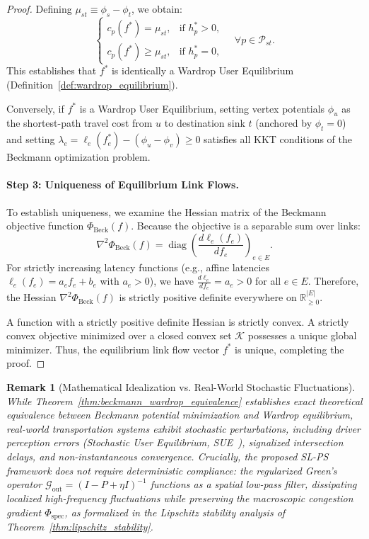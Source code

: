 \documentclass[11pt,a4paper]{article}
\newtheorem{remark}{Remark}
\begin{document}
\begin{proof}
Defining $\mu_{st} \equiv \phi_s - \phi_t$, we obtain:
\begin{equation}
\begin{cases}
c_p(f^*) = \mu_{st}, & \text{if } h_p^* > 0, \\
c_p(f^*) \ge \mu_{st}, & \text{if } h_p^* = 0,
\end{cases}
\quad \forall p \in \mathcal{P}_{st}.
\end{equation}
This establishes that $f^*$ is identically a Wardrop User Equilibrium (Definition~\ref{def:wardrop_equilibrium}).

Conversely, if $f^*$ is a Wardrop User Equilibrium, setting vertex potentials $\phi_u$ as the shortest-path travel cost from $u$ to destination sink $t$ (anchored by $\phi_t = 0$) and setting $\lambda_e = \ell_e(f_e^*) - (\phi_u - \phi_v) \ge 0$ satisfies all KKT conditions of the Beckmann optimization problem.

\paragraph{Step 3: Uniqueness of Equilibrium Link Flows.}
To establish uniqueness, we examine the Hessian matrix of the Beckmann objective function $\Phi_{\text{Beck}}(f)$. Because the objective is a separable sum over links:
\begin{equation}
\nabla^2 \Phi_{\text{Beck}}(f) = \operatorname{diag}\left( \frac{d \ell_e(f_e)}{d f_e} \right)_{e \in E}.
\end{equation}
For strictly increasing latency functions (e.g., affine latencies $\ell_e(f_e) = a_e f_e + b_e$ with $a_e > 0$), we have $\frac{d \ell_e}{d f_e} = a_e > 0$ for all $e \in E$. Therefore, the Hessian $\nabla^2 \Phi_{\text{Beck}}(f)$ is strictly positive definite everywhere on $\mathbb{R}^{|E|}_{\ge 0}$.

A function with a strictly positive definite Hessian is strictly convex. A strictly convex objective minimized over a closed convex set $\mathcal{K}$ possesses a unique global minimizer. Thus, the equilibrium link flow vector $f^*$ is unique, completing the proof.
\end{proof}

\begin{remark}[Mathematical Idealization vs. Real-World Stochastic Fluctuations]
While Theorem~\ref{thm:beckmann_wardrop_equivalence} establishes exact theoretical equivalence between Beckmann potential minimization and Wardrop equilibrium, real-world transportation systems exhibit stochastic perturbations, including driver perception errors (Stochastic User Equilibrium, SUE~\cite{daganzo1977stochastic}), signalized intersection delays, and non-instantaneous convergence. Crucially, the proposed SL-PS framework does not require deterministic compliance: the regularized Green's operator $\mathcal{G}_{\text{out}} = (I - P + \eta I)^{-1}$ functions as a spatial low-pass filter, dissipating localized high-frequency fluctuations while preserving the macroscopic congestion gradient $\Phi_{\text{spec}}$, as formalized in the Lipschitz stability analysis of Theorem~\ref{thm:lipschitz_stability}.
\end{remark}
\end{document}
